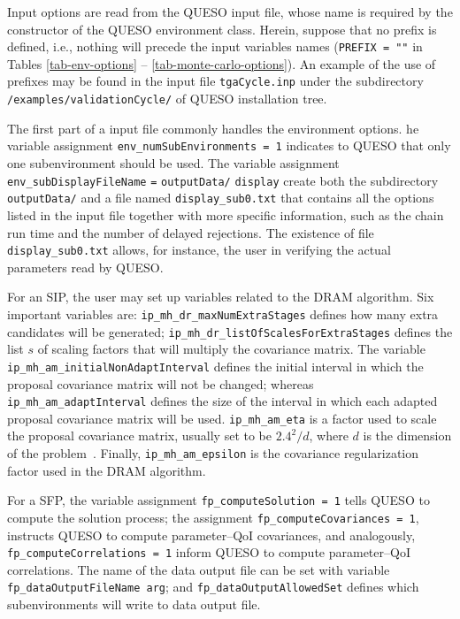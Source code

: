 Input options are read from the QUESO input file, whose name is required by the constructor of the QUESO environment class. Herein, suppose that no prefix is defined, i.e., nothing will precede the input variables names (\verb+PREFIX = ""+ in Tables \ref{tab-env-options} -- \ref{tab-monte-carlo-options}). An example of the use of prefixes may be found in the input file \texttt{tgaCycle.inp} under the subdirectory  \texttt{/examples/validationCycle/} of QUESO installation tree.

The first part of a input file commonly handles the environment options. he variable assignment \verb+env_numSubEnvironments = 1+ indicates to QUESO that only one subenvironment should be used. The variable assignment \texttt{env\_subDisplayFileName} \texttt{=} \texttt{outputData/} \texttt{display} create both the subdirectory \verb+outputData/+ and a file named \verb+display_sub0.txt+ that contains all the options listed in the input file together with more specific information, such as the chain run time and the number of delayed rejections. The existence of file  \verb+display_sub0.txt+  allows, for instance, the user in verifying the actual parameters read by QUESO.


For an SIP, the user may set up variables related to the DRAM algorithm. Six important variables are:  
\texttt{ip\_mh\_dr\_maxNumExtraStages} defines how many extra candidates will be generated; 
\texttt{ip\_mh\_dr\_listOfScalesForExtraStages} defines the list $s$ of scaling factors that will multiply the covariance matrix.
The variable \texttt{ip\_mh\_am\_initialNonAdaptInterval} defines the initial interval in which the proposal covariance matrix will not be changed;
whereas \texttt{ip\_mh\_am\_adaptInterval} defines the size of the interval in which each adapted proposal covariance matrix will be used. 
\texttt{ip\_mh\_am\_eta} is a factor used to scale the proposal covariance matrix, usually set to be $2.4^2/d$, where $d$ is the dimension of the problem~\cite{Laine08,HaLaMiSa06}. 
Finally, \texttt{ip\_mh\_am\_epsilon} is the covariance regularization factor used in the DRAM algorithm. %

For a SFP, the variable assignment \verb+fp_computeSolution = 1+ tells QUESO to compute the solution process; the assignment \verb+fp_computeCovariances = 1+,  instructs QUESO to compute parameter--QoI covariances, and analogously, \verb+fp_computeCorrelations = 1+ inform QUESO to compute  parameter--QoI correlations. The name of the data output file can be set with variable \verb+fp_dataOutputFileName arg+;  and \verb+fp_dataOutputAllowedSet+ defines which subenvironments will write to data output file.

